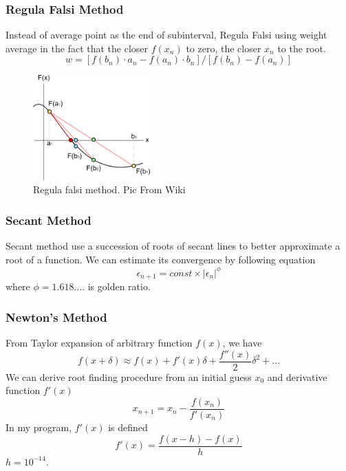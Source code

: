 \documentclass[12pt]{article}
\begin{document}
\subsubsection{Regula Falsi Method}
Instead of average point as the end of subinterval, Regula Falsi using weight average in the fact that the closer $f(x_{n})$ to zero, the closer $x_{n}$ to the root.
\begin{equation}
w=[f(b_{n})\cdot a_{n} - f(a_{n})\cdot b_{n}]/[f(b_{n})-f(a_{n})]
\end{equation}
\begin{figure}
	\begin{center}
		\includegraphics[width=0.4\textwidth]{Regula_falsi_method.png}
		\caption{Regula falsi method. Pic From Wiki}
		\label{fig2}
		
	\end{center}
\end{figure}

\subsubsection{Secant Method}
Secant method use a succession of roots of secant lines to better approximate a root of a function. We can estimate its convergence by following equation
\begin{equation}
\epsilon_{n+1}=const\times|\epsilon_{n}|^\phi
\end{equation}
where $\phi=1.618....$ is golden ratio. 
\subsubsection{Newton's Method}
From Taylor expansion of arbitrary function $f(x)$, we have
\begin{equation}
	f(x+\delta)\approx f(x)+f'(x)\delta+\frac{f''(x)}{2} \delta^2+...
\end{equation}
We can derive root finding procedure from an initial guess $x_{0}$ and derivative function $f'(x)$
\begin{equation}
	x_{n+1}=x_{n}-\frac{f(x_{n})}{f'(x_{n})}
\end{equation}
In my program, $f'(x)$ is defined
\begin{equation}
f'(x)=\frac{f(x-h)-f(x)}{h}
\end{equation}
$h=10^{-14}$.
\end{document}
